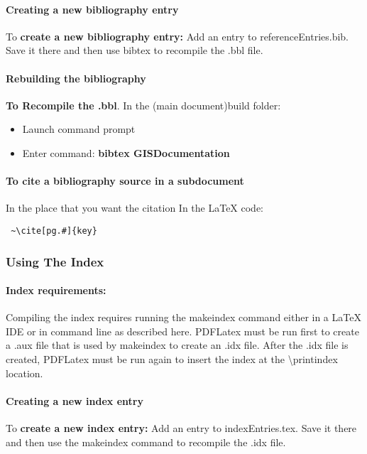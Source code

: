\paragraph{Creating a new bibliography entry}
To \textbf{create a new bibliography entry:} Add an entry to referenceEntries.bib.  Save it there and then use bibtex to recompile the .bbl file.
\paragraph{Rebuilding the bibliography}
\textbf{To Recompile the .bbl}.  In the (main document)build folder:
\begin{itemize}
\item Launch command prompt
\item Enter command: \textbf{{\large bibtex GISDocumentation}}
\end{itemize}
\paragraph{To cite a bibliography source in a subdocument}
In the place that you want the citation In the \LaTeX{} code:
\begin{verbatim} ~\cite[pg.#]{key} \end{verbatim}
\clearpage

\subsubsection[Using The Index]{{Using The Index}}
\paragraph{Index requirements:}
Compiling the index requires running the makeindex command either in a \LaTeX{} IDE or in command line as described here.  PDFLatex must be run first to create a .aux file that is used by makeindex to create an .idx file.  After the .idx file is created, PDFLatex must be run again to insert the index at the \textbackslash printindex location.
\paragraph{Creating a new index entry}
To \textbf{create a new index entry:} Add an entry to indexEntries.tex.  Save it there and then use the makeindex command to recompile the .idx file.

